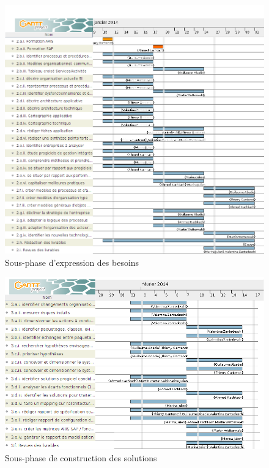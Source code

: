 \begin{figure}[h]
    \centering
    \includegraphics[width=150mm]{images/SPIE_besoins.png}
    \caption{Sous-phase d'expression des besoins}
    \label{diagram:si_map}
\end{figure}

\begin{figure}[h]
    \centering
    \includegraphics[width=150mm]{images/SPIE_3.png}
    \caption{Sous-phase de construction des solutions}
    \label{diagram:si_map}
\end{figure}

